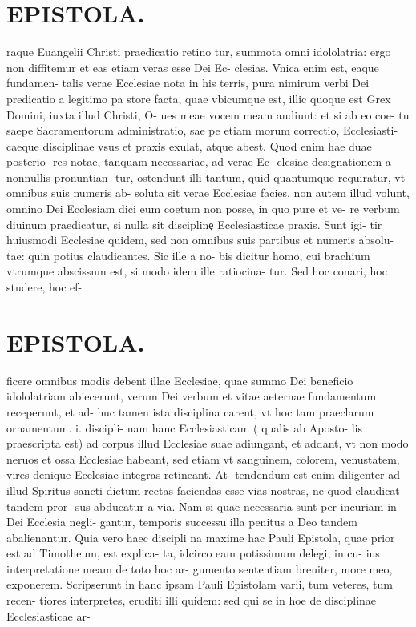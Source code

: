 \documentclass{article}
\begin{document}
\begin{pages}
\section*{EPISTOLA. }raque Euangelii Christi praedicatio retino tur, summota omni idololatria: ergo non diffitemur et eas etiam veras esse Dei Ec- clesias. Vnica enim est, eaque fundamen- talis verae Ecclesiae nota in his terris, pura nimirum verbi Dei predicatio a legitimo pa store facta, quae vbicumque est, illic quoque est Grex Domini, iuxta illud Christi, O- ues meae vocem meam audiunt: et si ab eo coe- tu saepe Sacramentorum administratio, sae pe etiam morum correctio, Ecclesiasti- caeque disciplinae vsus et praxis exulat, atque abest. Quod enim hae duae posterio- res notae, tanquam necessariae, ad verae Ec- clesiae designationem a nonnullis pronuntian- tur, ostendunt illi tantum, quid quantumque requiratur, vt omnibus suis numeris ab- soluta sit verae Ecclesiae facies. non autem illud volunt, omnino Dei Ecclesiam dici eum coetum non posse, in quo pure et ve- re verbum diuinum praedicatur, si nulla sit disciplinȩ Ecclesiasticae praxis. Sunt igi- tir huiusmodi Ecclesiae quidem, sed non omnibus suis partibus et numeris absolu- tae: quin potius claudicantes. Sic ille a no- bis dicitur homo, cui brachium vtrumque abscissum est, si modo idem ille ratiocina- tur. Sed hoc conari, hoc studere, hoc ef- 
\section*{EPISTOLA. }ficere omnibus modis debent illae Ecclesiae, quae summo Dei beneficio idololatriam abiecerunt, verum Dei verbum et vitae aeternae fundamentum receperunt, et ad- huc tamen ista disciplina carent, vt hoc tam praeclarum ornamentum. i. discipli- nam hanc Ecclesiasticam ( qualis ab Aposto- lis praescripta est) ad corpus illud Ecclesiae suae adiungant, et addant, vt non modo neruos et ossa Ecclesiae habeant, sed etiam vt sanguinem, colorem, venustatem, vires denique Ecclesiae integras retineant. At- tendendum est enim diligenter ad illud Spiritus sancti dictum rectas faciendas esse vias nostras, ne quod claudicat tandem pror- sus abducatur a via. Nam si quae necessaria sunt per incuriam in Dei Ecclesia negli- gantur, temporis successu illa penitus a Deo tandem abalienantur. Quia vero haec discipli na maxime hac Pauli Epistola, quae prior est ad Timotheum, est explica- ta, idcirco eam potissimum delegi, in cu- ius interpretatione meam de toto hoc ar- gumento sententiam breuiter, more meo, exponerem. Scripserunt in hanc ipsam Pauli Epistolam varii, tum veteres, tum recen- tiores interpretes, eruditi illi quidem: sed qui se in hoe de disciplinae Ecclesiasticae ar- 

\end{pages}
\end{document}

